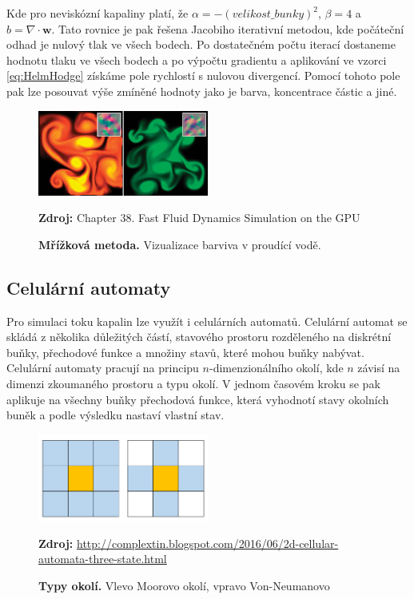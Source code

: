 Kde pro neviskózní kapaliny platí, že $\alpha = -( velikost\_bunky )^2$, $\beta = 4$ a $b = \nabla \cdot \mathbf{w}$. Tato rovnice je pak řešena Jacobiho iterativní metodou, kde počáteční odhad je nulový tlak ve všech bodech. Po dostatečném počtu iterací dostaneme hodnotu tlaku ve všech bodech a po výpočtu gradientu a aplikování ve vzorci \ref{eq:HelmHodge} získáme pole rychlostí s nulovou divergencí. Pomocí tohoto pole pak lze posouvat výše zmíněné hodnoty jako je barva, koncentrace částic a jiné.
\cite{GPUGemsGridFLuid}

\begin{figure}[hbt]
	\centering
	\captionsetup{justification=centering}
	\includegraphics[width=0.5\textwidth]{obrazky-figures/GridFluid.jpg}
	\caption{\textbf{Mřížková metoda.} Vizualizace barviva v proudící vodě.}
	\textbf{Zdroj: } Chapter 38. Fast Fluid Dynamics Simulation on the GPU \cite{GPUGemsGridFLuid}
	\label{fig:EulerFluid}
\end{figure}
 
\subsection{Celulární automaty}
Pro simulaci toku kapalin lze využít i celulárních automatů. Celulární automat se skládá z několika důležitých částí, stavového prostoru rozděleného na diskrétní buňky, přechodové funkce a množiny stavů, které mohou buňky nabývat. Celulární automaty pracují na principu $n$-dimenzionálního okolí, kde $n$ závisí na dimenzi zkoumaného prostoru a typu okolí. V jednom časovém kroku se pak aplikuje na všechny buňky přechodová funkce, která vyhodnotí stavy okolních buněk a podle výsledku nastaví vlastní stav. 

\begin{figure}[hbt]
	\centering
	\captionsetup{justification=centering}
	\includegraphics[width=0.5\textwidth]{obrazky-figures/Neighborhood.png}
	\caption{\textbf{Typy okolí.} Vlevo Moorovo okolí, vpravo Von-Neumanovo}
	\textbf{Zdroj: } \url{http://complextin.blogspot.com/2016/06/2d-cellular-automata-three-state.html}
	\label{fig:EulerFluid}
\end{figure}

